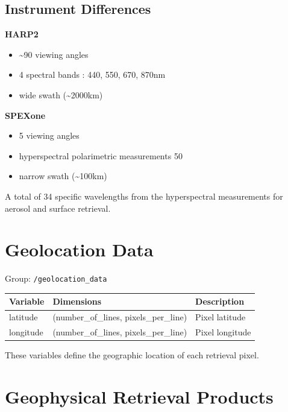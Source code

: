 \documentclass[
  letterpaper,
]{scrbook}
\providecommand{\tightlist}{%
  \setlength{\itemsep}{0pt}\setlength{\parskip}{0pt}}
\begin{document}
\subsection{Instrument Differences}\label{instrument-differences}

\textbf{HARP2}

\begin{itemize}
\tightlist
\item
  \textasciitilde90 viewing angles\\
\item
  4 spectral bands : 440, 550, 670, 870nm
\item
  wide swath (\textasciitilde2000km)
\end{itemize}

\textbf{SPEXone}

\begin{itemize}
\tightlist
\item
  5 viewing angles\\
\item
  hyperspectral polarimetric measurements 50
\item
  narrow swath (\textasciitilde100km)
\end{itemize}

A total of 34 specific wavelengths from the hyperspectral measurements
for aerosol and surface retrieval.

\section{Geolocation Data}\label{geolocation-data}

Group: \texttt{/geolocation\_data}

\begin{longtable}[]{@{}lll@{}}
\toprule\noalign{}
Variable & Dimensions & Description \\
\midrule\noalign{}
\endhead
\bottomrule\noalign{}
\endlastfoot
latitude & (number\_of\_lines, pixels\_per\_line) & Pixel latitude \\
longitude & (number\_of\_lines, pixels\_per\_line) & Pixel longitude \\
\end{longtable}

These variables define the geographic location of each retrieval pixel.

\section{Geophysical Retrieval
Products}\label{geophysical-retrieval-products}
\end{document}
